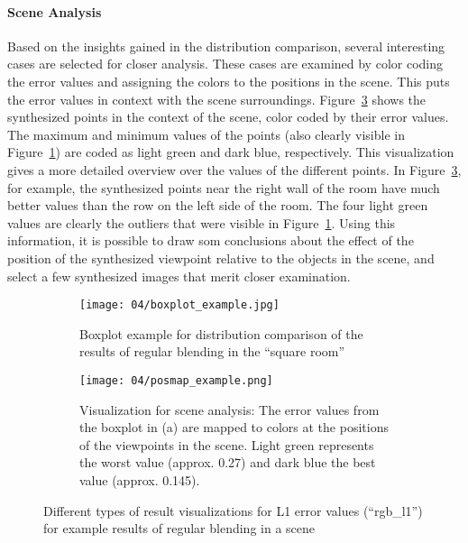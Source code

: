\paragraph{Scene Analysis}
Based on the insights gained in the distribution comparison, several interesting cases are selected for closer analysis. These cases are examined by color coding the error values and assigning the colors to the positions in the scene. This puts the error values in context with the scene surroundings. Figure~\ref{fig:posmap_example} shows the synthesized points in the context of the scene, color coded by their error values. The maximum and minimum values of the points (also clearly visible in Figure~\ref{fig:boxplot_example}) are coded as light green and dark blue, respectively. This visualization gives a more detailed overview over the values of the different points. In Figure~\ref{fig:posmap_example}, for example, the synthesized points near the right wall of the room have much better values than the row on the left side of the room. The four light green values are clearly the outliers that were visible in Figure~\ref{fig:boxplot_example}. Using this information, it is possible to draw som conclusions about the effect of the position of the synthesized viewpoint relative to the objects in the scene, and select a few synthesized images that merit closer examination.

\begin{figure}
\centering
    \hfill
    \begin{subfigure}[c]{0.5\textwidth}
            \centering
            \texttt{[image: 04/boxplot\_example.jpg]}
            \caption{Boxplot example for distribution comparison of the results of regular blending in the ``square room''} \label{fig:boxplot_example}
    \end{subfigure}%
    \hfill
    \begin{subfigure}[c]{0.5\textwidth}
            \centering
            \texttt{[image: 04/posmap\_example.png]}
            \caption{Visualization for scene analysis: The error values from the boxplot in (a) are mapped to colors at the positions of the viewpoints in the scene. Light green represents the worst value (approx. 0.27) and dark blue the best value (approx. 0.145).} \label{fig:posmap_example}
    \end{subfigure}
    \hfill
  \caption[Different types of result visualizations for L1 error values]{Different types of result visualizations for L1 error values (``rgb\_l1'') for example results of regular blending in a scene}
\end{figure}

